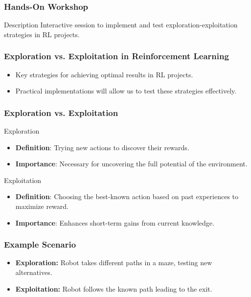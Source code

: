 \documentclass[aspectratio=169]{beamer}
\begin{document}
\begin{frame}[fragile]
    \frametitle{Hands-On Workshop}
    \begin{block}{Description}
        Interactive session to implement and test exploration-exploitation strategies in RL projects.
    \end{block}
\end{frame}

\begin{frame}[fragile]
    \frametitle{Exploration vs. Exploitation in Reinforcement Learning}
    \begin{itemize}
        \item Key strategies for achieving optimal results in RL projects.
        \item Practical implementations will allow us to test these strategies effectively.
    \end{itemize}
\end{frame}

\begin{frame}[fragile]
    \frametitle{Exploration vs. Exploitation}
    \begin{block}{Exploration}
        \begin{itemize}
            \item \textbf{Definition}: Trying new actions to discover their rewards.
            \item \textbf{Importance}: Necessary for uncovering the full potential of the environment.
        \end{itemize}
    \end{block}
    
    \begin{block}{Exploitation}
        \begin{itemize}
            \item \textbf{Definition}: Choosing the best-known action based on past experiences to maximize reward.
            \item \textbf{Importance}: Enhances short-term gains from current knowledge.
        \end{itemize}
    \end{block}
\end{frame}

\begin{frame}[fragile]
    \frametitle{Example Scenario}
    \begin{itemize}
        \item \textbf{Exploration:} Robot takes different paths in a maze, testing new alternatives.
        \item \textbf{Exploitation:} Robot follows the known path leading to the exit.
    \end{itemize}
\end{frame}
\end{document}
